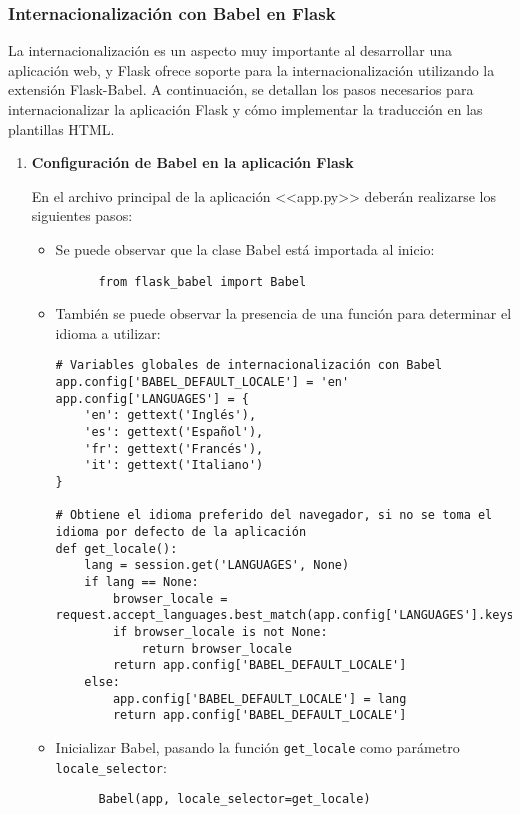 \subsubsection{Internacionalización con Babel en Flask}

La internacionalización es un aspecto muy importante al desarrollar una aplicación web, y Flask ofrece soporte para la internacionalización utilizando la extensión Flask-Babel. A continuación, se detallan los pasos necesarios para internacionalizar la aplicación Flask y cómo implementar la traducción en las plantillas HTML.

\begin{enumerate}

  \item \textbf{Configuración de Babel en la aplicación Flask}

  En el archivo principal de la aplicación <<app.py>> deberán realizarse los siguientes pasos:

  \begin{itemize}
    \item Se puede observar que la clase Babel está importada al inicio:
      \begin{verbatim}
      from flask_babel import Babel
      \end{verbatim}

    \item También se puede observar la presencia de una función para determinar el idioma a utilizar:
      \begin{verbatim}
# Variables globales de internacionalización con Babel
app.config['BABEL_DEFAULT_LOCALE'] = 'en'
app.config['LANGUAGES'] = {
    'en': gettext('Inglés'),
    'es': gettext('Español'),
    'fr': gettext('Francés'),
    'it': gettext('Italiano')
}

# Obtiene el idioma preferido del navegador, si no se toma el idioma por defecto de la aplicación
def get_locale():
    lang = session.get('LANGUAGES', None)
    if lang == None:
        browser_locale = request.accept_languages.best_match(app.config['LANGUAGES'].keys())
        if browser_locale is not None:
            return browser_locale
        return app.config['BABEL_DEFAULT_LOCALE']
    else:
        app.config['BABEL_DEFAULT_LOCALE'] = lang
        return app.config['BABEL_DEFAULT_LOCALE']
      \end{verbatim}

    \item Inicializar Babel, pasando la función \texttt{get\_locale} como parámetro \texttt{locale\_selector}:
      \begin{verbatim}
      Babel(app, locale_selector=get_locale)
      \end{verbatim}
  \end{itemize}


\end{enumerate}

